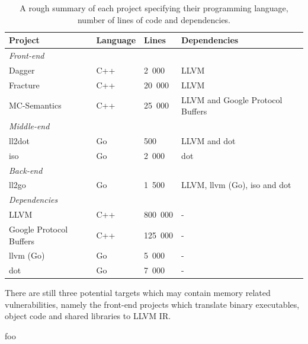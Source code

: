 \begin{table}[htbp]
	\begin{center}
		\begin{tabular}{|l|l|l|l|}
			\hline
			\textbf{Project} & \textbf{Language} & \textbf{Lines} & \textbf{Dependencies} \\
			\hline
			\multicolumn{4}{|l|}{\hspace{4ex} \textit{Front-end}} \\
			\hline
			Dagger & C++ & 2~000 & LLVM \\
			Fracture & C++ & 20~000 & LLVM \\
			MC-Semantics & C++ & 25~000 & LLVM and Google Protocol Buffers \\
			\hline
			\multicolumn{4}{|l|}{\hspace{4ex} \textit{Middle-end}} \\
			\hline
			ll2dot & Go & 500 & LLVM and dot \\
			iso & Go & 2~000 & dot \\
			\hline
			\multicolumn{4}{|l|}{\hspace{4ex} \textit{Back-end}} \\
			\hline
			ll2go & Go & 1~500 & LLVM, llvm (Go), iso and dot \\
			\hline
			\multicolumn{4}{|l|}{\hspace{4ex} \textit{Dependencies}} \\
			\hline
			LLVM & C++ & 800~000 & - \\
			Google Protocol Buffers & C++ & 125~000 & - \\
			llvm (Go) & Go & 5~000 & - \\
			dot & Go & 7~000 & - \\
			\hline
		\end{tabular}
	\end{center}
	\caption{A rough summary of each project specifying their programming language, number of lines of code and dependencies.}
	\label{tbl:loc_summary}
\end{table}

There are still three potential targets which may contain memory related vulnerabilities, namely the front-end projects which translate binary executables, object code and shared libraries to LLVM IR.

foo



